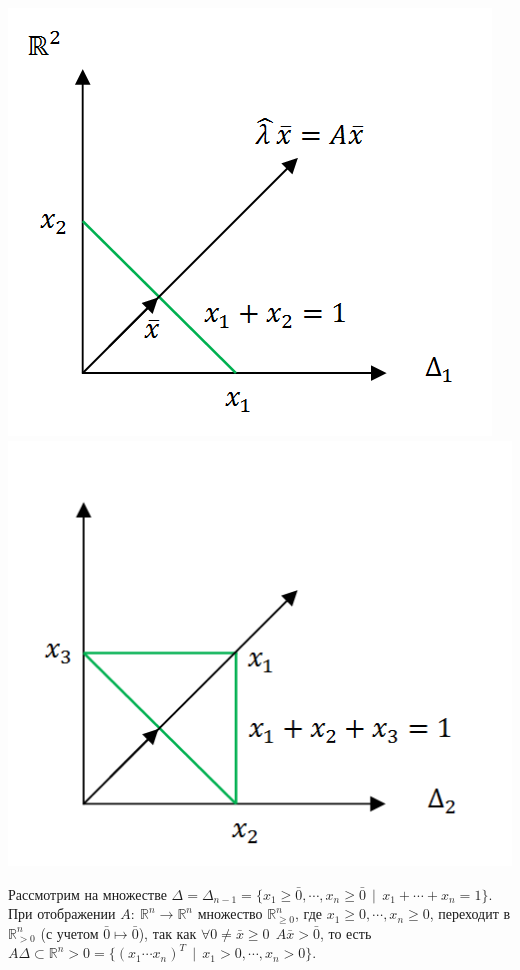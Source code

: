 \documentclass[12pt]{article}
\theoremstyle{definition}
\numberwithin{equation}{section}
\begin{document}
	\begin{center}
		\includegraphics[scale=0.8]{l15_1.png}
		\includegraphics[scale=0.8]{l15_2.png}\\
	\end{center}
	Рассмотрим на множестве $\Delta=\Delta_{n-1}=\{ x_1\geqslant \bar 0, \cdots, x_n\geqslant \bar 0 ~~|~~ x_1+\cdots +x_n=1 \}$.\\
	При отображении $A:~\mathbb{R}^n\to \mathbb{R}^n$ множество $\mathbb{R}^n_{\geqslant 0}$, где $x_1\geqslant 0, \cdots, x_n\geqslant 0$, переходит в $\mathbb{R}^n_{>0}$ (с учетом $\bar 0 \mapsto \bar 0$), так как $\forall 0\neq \bar x \geqslant 0~~A\bar x>\bar 0$, то есть $A\Delta \subset \mathbb{R}^n>0=\{ (x_1 \cdots x_n)^T ~~|~~x_1>0, \cdots, x_n>0 \}$.
\end{document}
